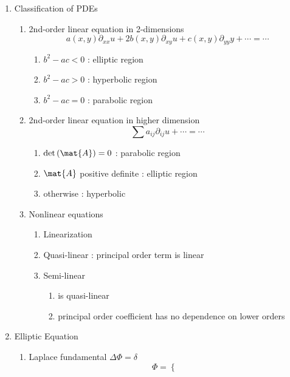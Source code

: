 \documentclass[10pt]{extarticle}
\begin{document}
\begin{multicols}{2}
\begin{enumerate}
	\item Classification of PDEs
	\begin{enumerate}
		\item 2nd-order linear equation in 2-dimensions
		\begin{equation*}
			a(x,y)\partial_{xx}u + 2b(x,y)\partial_{xy}u + c(x,y)\partial_{yy}y + \cdots = \cdots
		\end{equation*}
		\begin{enumerate}
			\item $b^2 - ac < 0$ : elliptic region
			\item $b^2 - ac > 0$ : hyperbolic region
			\item $b^2 - ac = 0$ : parabolic region
		\end{enumerate}
		\item 2nd-order linear equation in higher dimension
		\begin{equation*}
			\sum a_{ij}\partial_{ij}u + \cdots = \cdots
		\end{equation*}
		\begin{enumerate}
			\item $\det\left(\mat{A}\right) = 0$ : parabolic region
			\item $\mat{A}$ positive definite : elliptic region
			\item otherwise : hyperbolic
		\end{enumerate}
		\item Nonlinear equations
		\begin{enumerate}
			\item Linearization
			\item Quasi-linear : principal order term is linear
			\item Semi-linear
			\begin{enumerate}
				\item is quasi-linear
				\item principal order coefficient has no dependence on lower orders
			\end{enumerate}
		\end{enumerate}
	\end{enumerate}
	\item Elliptic Equation
	\begin{enumerate}
		\item Laplace fundamental $\Delta\Phi = \delta$
		\begin{equation*}
			\Phi = \begin{cases}

\end{cases}
\end{equation*}
\end{enumerate}
\end{enumerate}
\end{multicols}
\end{document}
